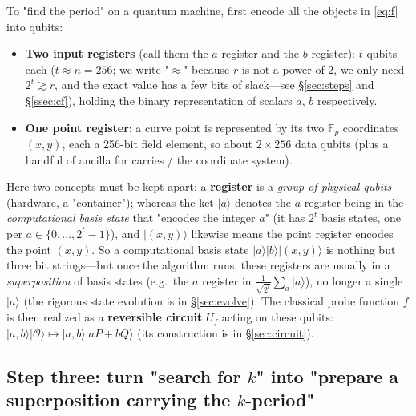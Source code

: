 \documentclass[11pt]{article}
\newcommand{\secref}[1]{\hyperref[#1]{\S\ref*{#1}}}
\begin{document}
To "find the period" on a quantum machine, first encode all the objects in \eqref{eq:f} into qubits:
\begin{itemize}[leftmargin=1.4em]
\item \textbf{Two input registers} (call them the $a$ register and the $b$ register): $t$ qubits each ($t\approx n=256$; we write "$\approx$" because $r$ is not a power of $2$, we only need $2^t\gtrsim r$, and the exact value has a few bits of slack---see \secref{sec:steps} and \secref{ssec:cf}), holding the binary representation of scalars $a$, $b$ respectively.
\item \textbf{One point register}: a curve point is represented by its two $\mathbb{F}_p$ coordinates $(x,y)$, each a 256-bit field element, so about
$2\times256$ data qubits (plus a handful of ancilla for carries / the coordinate system).
\end{itemize}
Here two concepts must be kept apart: a \textbf{register} is a \emph{group of physical qubits} (hardware, a "container"); whereas the ket $\lvert a\rangle$ denotes the
$a$ register being in the \emph{computational basis state} that "encodes the integer $a$" (it has $2^t$ basis states, one per $a\in\{0,\dots,2^t-1\}$), and $\lvert(x,y)\rangle$
likewise means the point register encodes the point $(x,y)$. So a computational basis state $\lvert a\rangle\lvert b\rangle\lvert (x,y)\rangle$
is nothing but three bit strings---but once the algorithm runs, these registers are usually in a \emph{superposition} of basis states (e.g.\ the $a$ register in
$\tfrac{1}{\sqrt{2^t}}\sum_a\lvert a\rangle$), no longer a single $\lvert a\rangle$ (the rigorous state evolution is in \secref{sec:evolve}).
The classical probe function $f$ is then realized as a \textbf{reversible circuit} $U_f$ acting on these qubits: $\lvert a,b\rangle\lvert\mathcal{O}\rangle\mapsto
\lvert a,b\rangle\lvert aP+bQ\rangle$ (its construction is in \secref{sec:circuit}).

\subsection{Step three: turn "search for $k$" into "prepare a superposition carrying the $k$-period"}
\end{document}
